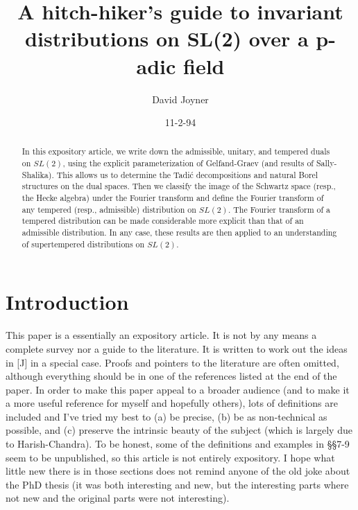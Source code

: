 

%



\author{David Joyner}
\title{A hitch-hiker's guide to invariant distributions on SL(2) over a p-adic field}
\date{11-2-94}
\maketitle

\begin{abstract}
In this expository article, we write down the admissible, unitary, and
tempered duals on $SL(2)$, using the explicit parameterization of
Gelfand-Graev (and results of Sally-Shalika). This allows us to determine
the Tadi\'c decompositions and natural Borel structures on the dual spaces.
Then we classify the image of the Schwartz space (resp., the Hecke algebra)
under the Fourier transform and define the Fourier transform of any tempered
(resp., admissible) distribution on $SL(2)$. The Fourier transform of a
tempered distribution can be made considerable more explicit than that of an
admissible distribution. In any case, these results are then applied to an
understanding of supertempered distributions on $SL(2)$.
\end{abstract}

\tableofcontents


\section{Introduction}

This paper is a essentially an expository article. It is not by any means a
complete survey nor a guide to the literature. It is written to work out the
ideas in [J] in a special case. Proofs and pointers to the literature are
often omitted, although everything should be in one of the references listed
at the end of the paper. In order to make this paper appeal to a broader
audience (and to make it a more useful reference for myself and hopefully
others), lots of definitions are included and I've tried my best to (a) be
precise, (b) be as non-technical as possible, and (c) preserve the intrinsic
beauty of the subject (which is largely due to Harish-Chandra). To be
honest, some of the definitions and examples in \S \S 7-9 seem to be
unpublished, so this article is not entirely expository. I hope what little
new there is in those sections does not remind anyone of the old joke about
the PhD thesis (it was both interesting and new, but the interesting parts
where not new and the original parts were not interesting).

